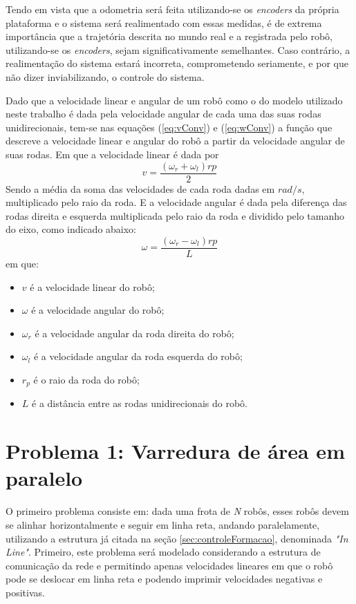 Tendo em vista que a odometria será feita utilizando-se os \emph{encoders} da própria plataforma e o sistema será realimentado com essas medidas, é de extrema importância que a trajetória descrita no mundo real e a registrada pelo robô, utilizando-se os \emph{encoders}, sejam significativamente semelhantes. Caso contrário, a realimentação do sistema estará incorreta, comprometendo seriamente, e por que não dizer inviabilizando, o controle do sistema. 

Dado que a velocidade linear e angular de um robô como o do modelo utilizado neste trabalho é dada pela velocidade angular de cada uma das suas rodas unidirecionais, tem-se nas equações (\ref{eq:vConv}) e (\ref{eq:wConv}) a função que descreve a velocidade linear e angular do robô a partir da velocidade angular de suas rodas. Em que a velocidade linear é dada por
\begin{equation}
	v = \dfrac{(\omega_{r} + \omega_{l}) rp}{2}
	\label{eq:vConv}
\end{equation}
Sendo a média da soma das velocidades de cada roda dadas em $rad/s$, multiplicado pelo raio da roda. E a velocidade angular é dada pela diferença das rodas  direita e esquerda  multiplicada pelo raio da roda e dividido pelo tamanho do eixo, como indicado abaixo:
\begin{equation}
	\omega = \dfrac{(\omega_{r} - \omega_{l}) rp}{L}
	\label{eq:wConv}
\end{equation}
em que:
\begin{itemize}
	\item $v$ é a velocidade linear do robô;
	\item $\omega$ é a velocidade angular do robô;
	\item $\omega_{r}$ é a velocidade angular da roda direita do robô;
	\item $\omega_{l}$ é a velocidade angular da roda esquerda do robô;
	\item $r_{p}$ é o raio da roda do robô;
	\item $L$ é a distância entre as rodas unidirecionais do robô.
\end{itemize}

\section{Problema 1: Varredura de área em paralelo}
\label{sec:P1}
O primeiro problema consiste em: dada uma frota de \emph{N} robôs, esses robôs devem se alinhar horizontalmente e seguir em linha reta, andando paralelamente, utilizando a estrutura já citada na seção \ref{sec:controleFormacao}, denominada \emph{"In Line"}. Primeiro, este problema será modelado considerando a estrutura de comunicação da rede e permitindo apenas velocidades lineares em que o robô pode se deslocar em linha reta e podendo imprimir velocidades negativas e positivas. 

